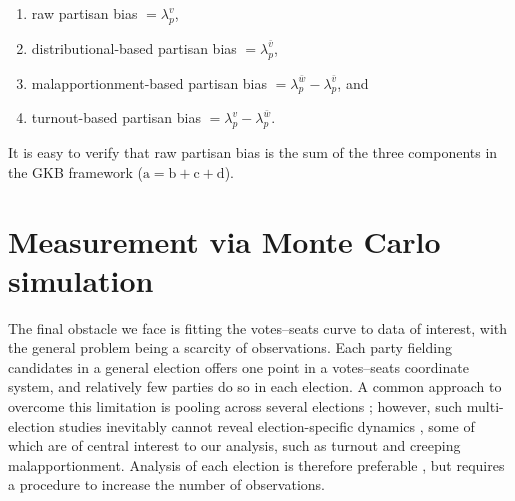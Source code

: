 \documentclass[letter,12pt]{article}
\begin{document}
\begin{enumerate}
\renewcommand{\theenumi}{\alph{enumi}}
\item raw partisan bias $=\lambda_p^v$,
\item distributional-based partisan bias $=\lambda_p^{\bar{v}}$, 
\item malapportionment-based partisan bias $=\lambda_p^{\bar{w}}-\lambda_p^{\bar{v}}$, and
\item turnout-based partisan bias $=\lambda_p^v-\lambda_p^{\bar{w}}$.
\end{enumerate}

\noindent It is easy to verify that raw partisan bias is the sum of the three components in the GKB framework ($\text{a}=\text{b}+\text{c}+\text{d}$). 

\section{Measurement via Monte Carlo simulation}

The final obstacle we face is fitting the votes--seats curve to data of interest, with the general problem being a scarcity of observations. Each party fielding candidates in a general election offers one point in a votes--seats coordinate system, and relatively few parties do so in each election. A common approach to overcome this limitation is pooling across several elections \citep[e.g.,][]{marquez2014biasBlog}; however, such multi-election studies inevitably cannot reveal election-specific dynamics \citep{jackmanMeasuringBias1994}, some of which are of central interest to our analysis, such as turnout and creeping malapportionment. Analysis of each election is therefore preferable \citep{niemi.fett1986swing}, but requires a procedure to increase the number of observations.
\end{document}

